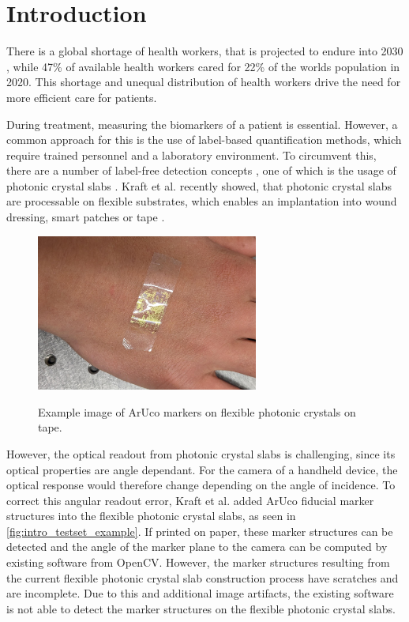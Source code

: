 \documentclass[10pt]{book}
\newcommand{\figureref}[1]{\autoref{#1}}
\begin{document}
\tableofcontents
\listoffigures
\mainmatter
\chapter{Introduction}

There is a global shortage of health workers, that is projected to endure into 2030 \cite{BMJHealthWorkforce22}, while 47\% of available health workers cared for 22\% of the worlds population in 2020. This shortage and unequal distribution of health workers drive the need for more efficient care for patients. 

During treatment, measuring the biomarkers of a patient is essential. However, a common approach for this is the use of label-based quantification methods, which require trained personnel and a laboratory environment. To circumvent this, there are a number of label-free detection concepts \cite{rapp2010biosensors}, one of which is the usage of photonic crystal slabs \cite{Pitruzzello_2018}. Kraft et al. recently showed, that photonic crystal slabs are processable on flexible substrates, which enables an implantation into wound dressing, smart patches or tape \cite{Fab23}.

\begin{figure}
  \caption{Example image of \ac{ArUco} markers on flexible photonic crystals on tape.}
  \includegraphics[width=0.65\textwidth]{image/testset_example_crop}
  \label{fig:intro_testset_example}
\end{figure}

However, the optical readout from photonic crystal slabs is challenging, since its optical properties are angle dependant. For the camera of a handheld device, the optical response would therefore change depending on the angle of incidence. To correct this angular readout error, Kraft et al. added \ac{ArUco} fiducial marker structures into the flexible photonic crystal slabs, as seen in \figureref{fig:intro_testset_example}. If printed on paper, these marker structures can be detected and the angle of the marker plane to the camera can be computed by existing software from \ac{OpenCV}. However, the marker structures resulting from the current flexible photonic crystal slab construction process have scratches and are incomplete. Due to this and additional image artifacts, the existing software is not able to detect the marker structures on the flexible photonic crystal slabs.
\end{document}
